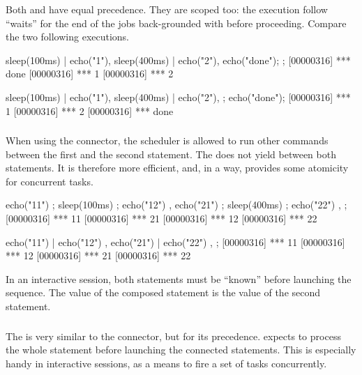 Both \samp{;} and \samp{,} have equal precedence.  They are scoped too: the
execution follow ``waits'' for the end of the jobs back-grounded with
\samp{,} before proceeding.  Compare the two following executions.

\begin{urbiscript}
{
  sleep(100ms) | echo("1"),
  sleep(400ms) | echo("2"),
  echo("done");
};
[00000316] *** done
[00000316] *** 1
[00000316] *** 2
\end{urbiscript}

\begin{urbiscript}
{
  sleep(100ms) | echo("1"),
  sleep(400ms) | echo("2"),
};
echo("done");
[00000316] *** 1
[00000316] *** 2
[00000316] *** done
\end{urbiscript}


\subsubsection{\samp{|}}
When using the \samp{;} connector, the scheduler is allowed to run
other commands between the first and the second statement.  The
\samp{|} does not yield between both statements.  It is therefore more
efficient, and, in a way, provides some atomicity for concurrent tasks.

\begin{urbiscript}
{
  { echo("11") ; sleep(100ms) ; echo("12") },
  { echo("21") ; sleep(400ms) ; echo("22") },
};
[00000316] *** 11
[00000316] *** 21
[00000316] *** 12
[00000316] *** 22
\end{urbiscript}

\begin{urbiscript}
{
  { echo("11") | echo("12") },
  { echo("21") | echo("22") },
};
[00000316] *** 11
[00000316] *** 12
[00000316] *** 21
[00000316] *** 22
\end{urbiscript}

In an interactive session, both statements must be ``known'' before
launching the sequence.  The value of the composed statement is the value of
the second statement.

\subsubsection{\samp{\&}}

The \samp{\&} is very similar to the \samp{,} connector, but for its
precedence.  \urbi expects to process the whole statement before launching
the connected statements.  This is especially handy in interactive sessions,
as a means to fire a set of tasks concurrently.


